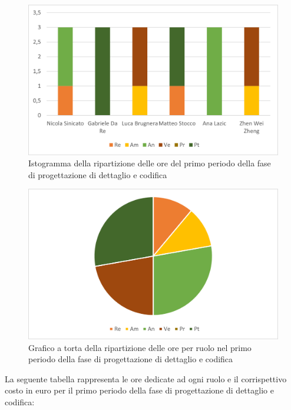 \begin{figure}[H]
    \centering
    \includegraphics[scale=0.6]{img/grafi preventivo/istogrammi/codifica/periodo1.png}
    \caption{Istogramma della ripartizione delle ore del primo periodo della fase di progettazione di dettaglio e codifica}
\end{figure}
\begin{figure}[H]
    \centering
    \includegraphics[scale=0.6]{img/grafi preventivo/torta/codifica/periodo1.png}
    \caption{Grafico a torta della ripartizione delle ore per ruolo nel primo periodo della fase di progettazione di dettaglio e codifica}
\end{figure}
La seguente tabella rappresenta le ore dedicate ad ogni ruolo e il corrispettivo costo in euro per il primo periodo della fase di progettazione di dettaglio e codifica:

